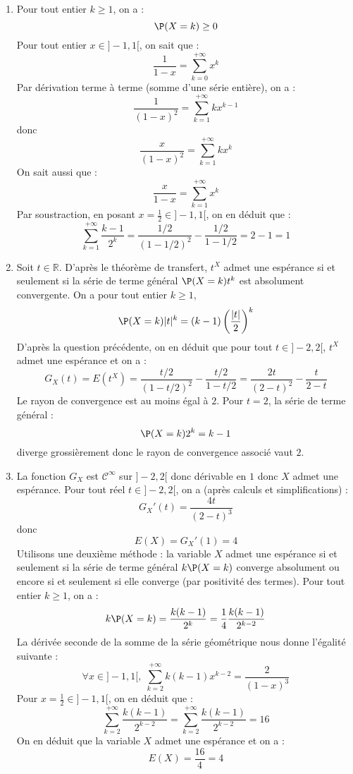 \documentclass[a4paper,twoside,french,11pt]{VcCours}
\begin{document}
\begin{enumerate}
\item Pour tout entier $k \geq 1$, on a :
$$ \P(X=k) \geq 0$$
Pour tout entier $x \in ]-1,1[$, on sait que :
$$ \dfrac{1}{1-x} = \sum_{k=0}^{+ \infty} x^k $$
Par dérivation terme à terme (somme d'une série entière), on a :
$$ \dfrac{1}{(1-x)^2} = \sum_{k=1}^{+ \infty} k x^{k-1}$$
donc
$$ \dfrac{x}{(1-x)^2} = \sum_{k=1}^{+ \infty} k x^{k}$$
On sait aussi que :
$$ \dfrac{x}{1-x} = \sum_{k=1}^{+ \infty}  x^{k}$$
Par soustraction, en posant $x = \tfrac{1}{2} \in ]-1,1[$, on en déduit que :
$$ \sum_{k=1}^{+ \infty} \dfrac{k-1}{2^k} = \dfrac{1/2}{(1-1/2)^2} - \dfrac{1/2}{1-1/2} = 2-1=1$$
\item Soit $t \in \mathbb{R}$. D'après le théorème de transfert, $t^X$ admet une espérance si et seulement si la série de terme général $\P(X=k) t^k$ est absolument convergente. On a pour tout entier $k \geq 1$,
$$ \P(X=k) \vert t \vert ^k = (k-1) \left( \dfrac{\vert t \vert }{2} \right)^k$$
D'après la question précédente, on en déduit que pour tout $t \in ]-2,2[$, $t^X$ admet une espérance et on a :
$$ G_X(t) =E(t^X) = \dfrac{t/2}{(1-t/2)^2} - \dfrac{t/2}{1-t/2} =  \dfrac{2t}{(2-t)^2} - \dfrac{t}{2-t}  $$
Le rayon de convergence est au moins égal à $2$. Pour $t=2$, la série de terme général :
$$ \P(X=k) 2^k = k-1$$
diverge grossièrement donc le rayon de convergence associé vaut $2$.
\item La fonction $G_X$ est $\mathcal{C}^{\infty}$ sur $]-2,2[$ donc dérivable en $1$ donc $X$ admet une espérance. Pour tout réel $t \in ]-2,2[$, on a (après calculs et simplifications) :
$$ G_X'(t) = \dfrac{4t}{(2-t)^3}$$
donc
$$ E(X) = G_X'(1) = 4$$
Utilisons une deuxième méthode : la variable $X$ admet une espérance si et seulement si la série de terme général $k \P(X=k)$ converge absolument ou encore si et seulement si elle converge (par positivité des termes). Pour tout entier $k \geq 1$, on a :
$$ k \P(X=k) =\dfrac{k(k-1)}{2^k} = \dfrac{1}{4} \dfrac{k(k-1)}{2^{k-2}}$$
La dérivée seconde de la somme de la série géométrique nous donne l'égalité suivante :
$$ \forall x \in ]-1,1[, \; \sum_{k=2}^{+ \infty} k(k-1) x^{k-2} = \dfrac{2}{(1-x)^3}$$
Pour $x= \tfrac{1}{2} \in ]-1,1[$, on en déduit que :
$$  \sum_{k=2}^{+ \infty}  \dfrac{k(k-1)}{2^{k-2}} =  \sum_{k=2}^{+ \infty}  \dfrac{k(k-1)}{2^{k-2}} = 16$$
On en déduit que la variable $X$ admet une espérance et on a :
$$ E(X) = \dfrac{16}{4} = 4$$
\end{enumerate}
\end{document}
